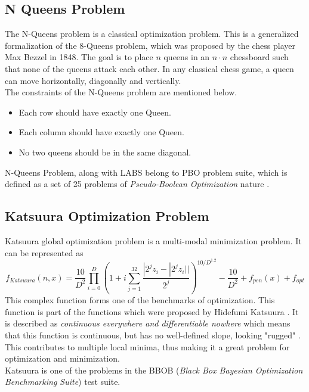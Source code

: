 \documentclass{article}
\begin{document}
\subsection{N Queens Problem}\label{sec:nqueens}
The N-Queens problem is a classical optimization problem. This is a generalized formalization of the 8-Queens problem, which was proposed by the chess player Max Bezzel in 1848. The goal is to place $n$ queens in an $n \cdot n$ chessboard such that none of the queens attack each other. In any classical chess game, a queen can move horizontally, diagonally and vertically. \\ 
The constraints of the N-Queens problem are mentioned below.  \cite{n_queens}
\begin{itemize}
    \item Each row should have exactly one Queen. 
    \item Each column should have exactly one Queen.
    \item No two queens should be in the same diagonal.
\end{itemize}
N-Queens Problem, along with LABS belong to PBO problem suite, which is defined as a set of 25 problems of  \textit{Pseudo-Boolean Optimization} nature \cite{IOHprofiler}. 

\subsection{Katsuura Optimization Problem} \label{sec:katsuura}
Katsuura global optimization problem is a multi-modal minimization problem. It can be represented as \cite{katsuura-source}
\begin{equation*}
     f_{Katsuura}(n, x) = \frac{10}{D^2} \prod_{i=0}^{D} \left ( 1 + i \sum_{j=1}^{32} \frac{|2^jz_i- |2^j z_i||}{2^j} \right )^{10/D^{1.2}}-\frac{10}{D^2} + f_{pen}(x) + f_{opt}
\end{equation*}
This complex function forms one of the benchmarks of optimization. This function is part of the functions which were proposed by Hidefumi Katsuura \cite{katsuura-actualpaper}. It is described as \textit{continuous everywhere and differentiable nowhere} which means that this function is continuous, but has no well-defined slope, looking "rugged" \cite{rugged-boi}. This contributes to multiple local minima, thus making it a great problem for optimization and minimization. \\
Katsuura is one of the problems in the BBOB  (\textit{Black Box Bayesian Optimization Benchmarking Suite}) test suite.
\end{document}
